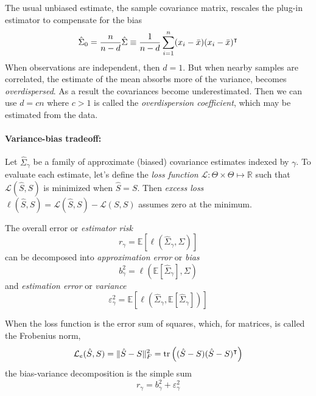 The usual unbiased estimate, the sample covariance matrix, rescales the plug-in estimator to compensate for the bias
\begin{equation}
\hat\Sigma_0 = \frac n {n - d} \hat\Sigma \equiv \frac 1 {n-d} \sum\limits_{i=1}^n (x_i - \bar x) (x_i - \bar x)^\intercal
\end{equation}
When observations are independent, then $d=1$.  But when nearby samples are correlated, the estimate of the mean absorbs more of the variance, becomes \emph{overdispersed}. As a result the covariances become underestimated. Then we can use $d=cn$ where $c>1$ is called the \emph{overdispersion coefficient}, which may be estimated from the data.

\paragraph{Variance-bias tradeoff:}
Let $\hat\Sigma_\gamma$ be a family of approximate (biased) covariance estimates indexed by $\gamma$. To evaluate each estimate, let's define the \emph{loss function} $\mathcal L : \Theta \times \Theta \mapsto \mathbb R$ such that $\mathcal L(\hat S,S)$ is minimized when $\hat S = S$.  Then \emph{excess loss} $\ell(\hat S, S) = \mathcal L(\hat S, S) - \mathcal L(S,S)$ assumes zero at the minimum.

The overall error or \emph{estimator risk} 
\begin{equation}
r_\gamma = \mathbb E\left[ \ell\left(\hat\Sigma_\gamma,\Sigma\right) \right]
\end{equation}
can be decomposed into \emph{approximation error} or \emph{bias}   
\begin{equation}
b_\gamma^2 = \ell \left( \mathbb E\left[\hat \Sigma_\gamma\right],\Sigma\right)
\end{equation}
and \emph{estimation error} or \emph{variance}
\begin{equation}
\varepsilon_\gamma^2 = \mathbb E \left[ \ell\left(\hat \Sigma_\gamma, 
\mathbb E\left[\hat \Sigma_\gamma\right]\right) \right]
\end{equation}

When the loss function is the error sum of squares, which, for matrices, is called the Frobenius norm, 
\begin{equation}
\mathcal L_e(\hat S,S) = \|\hat S-S\|_F^2 = \operatorname{tr}\left((\hat S-S)(\hat S-S)^\intercal\right)
\end{equation}
the bias-variance decomposition is the simple sum
\begin{equation}
r_\gamma =  b_\gamma^2 + \varepsilon_\gamma^2
\end{equation}

